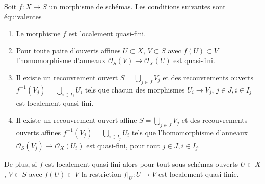 \begin{lemma}
\label{lemma-locally-quasi-finite-characterize}
Soit $f : X \to S$ un morphisme de schémas. Les conditions
suivantes sont équivalentes
\begin{enumerate}
\item Le morphisme $f$ est localement quasi-fini.
\item Pour toute paire d'ouverts affines $U \subset X$, $V \subset S$
avec $f(U) \subset V$ l'homomorphisme
d'anneaux $\mathcal{O}_S(V) \to \mathcal{O}_X(U)$ est quasi-fini.
\item Il existe un recouvrement ouvert $S = \bigcup_{j \in J} V_j$ et
des recouvrements ouverts $f^{-1}(V_j) = \bigcup_{i \in I_j} U_i$ tels que chacun
des morphismes $U_i \to V_j$, $j\in J, i\in I_j$ est localement
quasi-fini.
\item Il existe un recouvrement ouvert affine $S = \bigcup_{j \in J} V_j$
et des recouvrements ouverts affines $f^{-1}(V_j) = \bigcup_{i \in I_j} U_i$ tels
que l'homomorphisme d'anneaux $\mathcal{O}_S(V_j) \to \mathcal{O}_X(U_i)$ est quasi-fini,
pour tout $j\in J, i\in I_j$.
\end{enumerate}
De plus, si $f$ est localement quasi-fini alors
pour tout sous-schémas ouverts $U \subset X$, $V \subset S$ avec $f(U) \subset V$
la restriction $f|_U : U \to V$ est localement quasi-finie.
\end{lemma}

